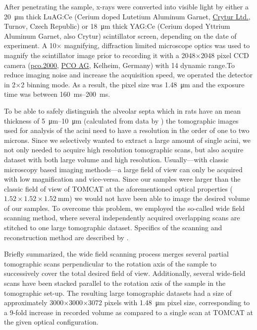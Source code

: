 \documentclass[paper=a4,abstract=true,english,DIV=calc]{scrartcl}
\begin{document}
After penetrating the sample, x-rays were converted into visible light by either a \SI{20}{\micro\meter} thick LuAG:Ce (Cerium doped Lutetium Aluminum Garnet, \href{http://www.crytur.cz/}{Crytur Ltd.}, Turnov, Czech Republic) or \SI{18}{\micro\meter} thick YAG:Ce (Cerium doped Yttrium Aluminum Garnet, also Crytur) scintillator screen, depending on the date of experiment.
A 10\(\times\) magnifying, diffraction limited microscope optics was used to magnify the scintillator image prior to recording it with a 2048\(\times\)2048 pixel CCD camera (\href{http://www.pco.de/sensitive-cameras/pco2000/}{pco.2000}, \href{http://www.pco.de/}{PCO AG}, Kelheim, Germany) with \SI{14}{\bit} dynamic range.To reduce imaging noise and increase the acquisition speed, we operated the detector in 2\(\times\)2 binning mode.
As a result, the pixel size was \SI{1.48}{\micro\meter} and the exposure time was between \SIrange{160}{200}{\milli\second}.

To be able to safely distinguish the alveolar septa which in rats have an mean thickness of \SIrange{5}{10}{\micro\meter} (calculated from data by \citet{Burri1974}) the tomographic images used for analysis of the acini need to have a resolution in the order of one to two microns.
Since we selectively wanted to extract a large amount of single acini, we not only needed to acquire high resolution tomographic scans, but also acquire dataset with both large volume and high resolution.
Usually---with classic microscopy based imaging methods---a large field of view can only be acquired with low magnification and vice-versa.
Since our samples were larger than the classic field of view of TOMCAT at the aforementioned optical properties (\(1.52\times1.52\times\SI{1.52}{\milli\meter}\)) we would not have been able to image the desired volume of our samples.
To overcome this problem, we employed the so-called wide field scanning method, where several independently acquired overlapping scans are stitched to one large tomographic dataset.
Specifics of the scanning and reconstruction method are described by \citet{Haberthuer2010a}.

Briefly summarized, the wide field scanning process merges several partial tomographic scans perpendicular to the rotation axis of the sample to successively cover the total desired field of view.
Additionally, several wide-field scans have been stacked parallel to the rotation axis of the sample in the tomographic set-up.
The resulting large tomographic datasets had a size of approximately 3000\(\times\)3000\(\times\)3072 pixels with \SI{1.48}{\micro\meter} pixel size, corresponding to a 9-fold increase in recorded volume as compared to a single scan at TOMCAT at the given optical configuration.
\end{document}
